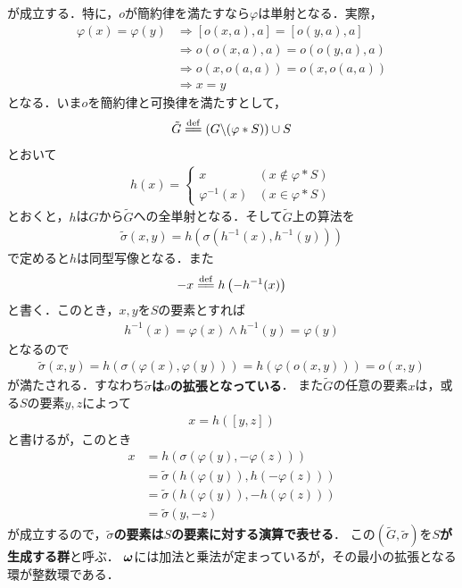 	が成立する．特に，$o$が簡約律を満たすなら$\varphi$は単射となる．実際，
	\begin{align}
		\varphi(x) = \varphi(y)
		&\Longrightarrow [o(x,a),a] = [o(y,a),a] \\
		&\Longrightarrow o(o(x,a),a) = o(o(y,a),a) \\
		&\Longrightarrow o(x,o(a,a)) = o(x,o(a,a)) \\
		&\Longrightarrow x = y
	\end{align}
	となる．いま$o$を簡約律と可換律を満たすとして，
	\begin{align}
		\tilde{G} \defeq \left( G \backslash (\varphi \ast S) \right) \cup S
	\end{align}
	とおいて
	\begin{align}
		h(x) = 
		\begin{cases}
			x & (x \notin \varphi \ast S) \\
			\varphi^{-1}(x) & (x \in \varphi \ast S)
		\end{cases}
	\end{align}
	とおくと，$h$は$G$から$\tilde{G}$への全単射となる．そして$\tilde{G}$上の算法を
	\begin{align}
		\tilde{\sigma}(x,y) = h\left(\sigma\left(h^{-1}(x),h^{-1}(y)\right)\right)
	\end{align}
	で定めると$h$は同型写像となる．また
	\begin{align}
		-x \defeq h\left( -h^{-1}(x) \right)
	\end{align}
	と書く．このとき，$x,y$を$S$の要素とすれば
	\begin{align}
		h^{-1}(x) = \varphi(x) \wedge h^{-1}(y) = \varphi(y)
	\end{align}
	となるので
	\begin{align}
		\tilde{\sigma}(x,y) = h\left(\sigma\left(\varphi(x),\varphi(y)\right)\right)
		= h\left(\varphi(o(x,y))\right)
		= o(x,y)
	\end{align}
	が満たされる．すなわち{\bf $\tilde{\sigma}$は$o$の拡張となっている}．
	また$\tilde{G}$の任意の要素$x$は，或る$S$の要素$y,z$によって
	\begin{align}
		x = h([y,z])
	\end{align}
	と書けるが，このとき
	\begin{align}
		x &= h\left(\sigma(\varphi(y),-\varphi(z))\right) \\
		&= \tilde{\sigma} \left(h(\varphi(y)),h(-\varphi(z))\right) \\
		&= \tilde{\sigma} \left(h(\varphi(y)),-h(\varphi(z))\right) \\
		&= \tilde{\sigma}(y,-z)
	\end{align}
	が成立するので，{\bf $\tilde{\sigma}$の要素は$S$の要素に対する演算で表せる}．
	この$(\tilde{G},\tilde{\sigma})$を{\bf $S$が生成する群}と呼ぶ．
	${\boldsymbol \omega}$には加法と乗法が定まっているが，その最小の拡張となる環が整数環である．
	
